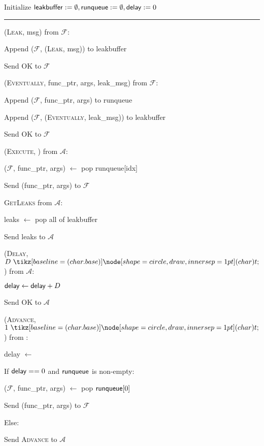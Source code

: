 \begin{bbox}[title={\textbf{Wrapper} $\mathcal{W}_{\msf{async}}$} ]

Initialize ${\mathsf {leakbuffer}} := \emptyset, {\mathsf {runqueue}} := \emptyset, {\mathsf {delay}} := 0$

\vspace{2mm} \hrule \vspace{2mm}

\OnInput (\textsc{Leak}, \textsf{msg}) from $\mathcal{F}$:

	\quad Append ($\mathcal{F}$, (\textsc{Leak}, \textsf{msg})) to \textsf{leakbuffer}
	
	\quad Send \textsc{OK} to $\mathcal{F}$


\OnInput (\textsc{Eventually}, \textsf{func\_ptr}, \textsf{args}, \textsf{leak\_msg}) from $\mathcal{F}$:

	\quad Append ($\mathcal{F}$, \textsf{func\_ptr}, \textsf{args}) to \textsf{runqueue}
	
	\quad Append ($\mathcal{F}$, (\textsc{Eventually}, \textsf{leak\_msg})) to \textsf{leakbuffer}
	
	\quad Send \textsc{OK} to $\mathcal{F}$
	
\OnInput (\textsc{Execute}, ) from $\mathcal{A}$:

	\quad ($\mathcal{F}$, \textsf{func\_ptr}, \textsf{args}) $\leftarrow$ pop \textsf{runqueue[idx]}
	
	\quad Send (\textsf{func\_ptr}, \textsf{args}) to $\mathcal{F}$
	
\OnInput \textsc{GetLeaks} from $\mathcal{A}$:

	\quad \textsf{leaks} $\leftarrow$ pop all of \textsf{leakbuffer}
	
	\quad Send \textsf{leaks} to $\mathcal{A}$
	
\OnInput (\textsc{Delay}, $D \token$) from $\mathcal{A}$:

	\quad ${\mathsf {delay}} \leftarrow {\mathsf {delay}} + D$
	
	\quad Send \textsc{OK} to $\mathcal{A}$
	
\OnInput (\textsc{Advance}, $1 \token$) from \Env:

	\quad \textsf{delay} $\leftarrow$ 
	
	\quad If ${\mathsf {delay}} == 0$ and ${\mathsf {runqueue}}$ is non-empty:
	
		\qquad ($\mathcal{F}$, \textsf{func\_ptr}, \textsf{args}) $\leftarrow$ pop ${\mathsf {runqueue}}[0]$
		
		\qquad Send (\textsf{func\_ptr}, \textsf{args}) to $\mathcal{F}$
	
	\quad Else:
	
		\qquad Send \textsc{Advance} to $\mathcal{A}$
		
	
\end{bbox}